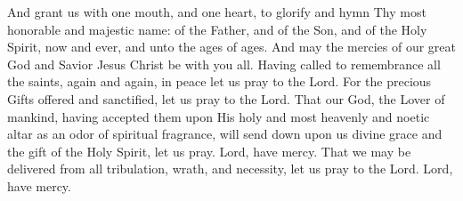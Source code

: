\begin{liturgicaltext}
    \priest And grant us with one mouth, and one heart, to glorify and hymn Thy most honorable and majestic name: of the Father, and of the Son, and of the Holy Spirit, now and ever, and unto the ages of ages. 
    \choir {}
    \priest And may the mercies of our great God and Savior Jesus Christ be with you all.
    \choir {}
    \deacon Having called to remembrance all the saints, again and again, in peace let us pray to the Lord.
    \choir {}
    \deacon For the precious Gifts offered and sanctified, let us pray to the Lord.
    \choir {}
    \deacon That our God, the Lover of mankind, having accepted them upon His holy and most heavenly and noetic altar as an odor of spiritual fragrance, will send down upon us divine grace and the gift of the Holy Spirit, let us pray.
    \choir Lord, have mercy.
    \deacon That we may be delivered from all tribulation, wrath, and necessity, let us pray to the Lord.
    \choirsemisecret Lord, have mercy. 
\end{liturgicaltext}
